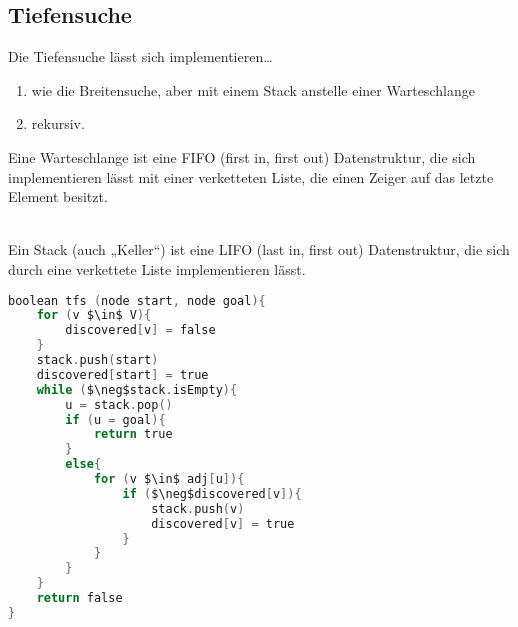 \subsection{Tiefensuche}
Die Tiefensuche lässt sich implementieren…
\begin{enumerate}
\item wie die Breitensuche, aber mit einem Stack anstelle einer Warteschlange
\item rekursiv.
\end{enumerate}
Eine Warteschlange ist eine FIFO (first in, first out) Datenstruktur, die sich implementieren lässt mit einer verketteten Liste, die einen Zeiger auf das letzte Element besitzt.\\
\\
Ein Stack (auch „Keller“) ist eine LIFO (last in, first out) Datenstruktur, die sich durch eine verkettete Liste implementieren lässt.\\
\begin{lstlisting}[language=C]
boolean tfs (node start, node goal){
	for (v $\in$ V){
		discovered[v] = false
	}
	stack.push(start)
	discovered[start] = true
	while ($\neg$stack.isEmpty){
		u = stack.pop()
		if (u = goal){
			return true
		}
		else{
			for (v $\in$ adj[u]){
				if ($\neg$discovered[v]){
					stack.push(v)
					discovered[v] = true
				}
			}
		}
	}
	return false
}
\end{lstlisting}

